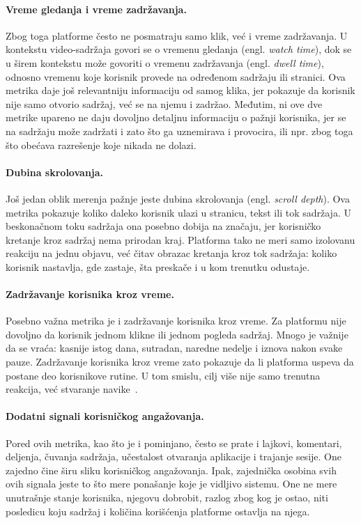 \paragraph{Vreme gledanja i vreme zadržavanja.}
Zbog toga platforme često ne posmatraju samo klik, već i vreme zadržavanja. U kontekstu video-sadržaja govori se o vremenu gledanja (engl. \textit{watch time}), dok se u širem kontekstu može govoriti o vremenu zadržavanja (engl. \textit{dwell time}), odnosno vremenu koje korisnik provede na određenom sadržaju ili stranici. Ova metrika daje još relevantniju informaciju od samog klika, jer pokazuje da korisnik nije samo otvorio sadržaj, već se na njemu i zadržao. Međutim, ni ove dve metrike upareno ne daju dovoljno detaljnu informaciju o pažnji korisnika, jer se na sadržaju može zadržati i zato što ga uznemirava i provocira, ili npr. zbog toga što obećava razrešenje koje nikada ne dolazi.

\paragraph{Dubina skrolovanja.}
Još jedan oblik merenja pažnje jeste dubina skrolovanja (engl. \textit{scroll depth}). Ova metrika pokazuje koliko daleko korisnik ulazi u stranicu, tekst ili tok sadržaja. U beskonačnom toku sadržaja ona posebno dobija na značaju, jer korisničko kretanje kroz sadržaj nema prirodan kraj. Platforma tako ne meri samo izolovanu reakciju na jednu objavu, već čitav obrazac kretanja kroz tok sadržaja: koliko korisnik nastavlja, gde zastaje, šta preskače i u kom trenutku odustaje.

\paragraph{Zadržavanje korisnika kroz vreme.}
Posebno važna metrika je i zadržavanje korisnika kroz vreme. Za platformu nije dovoljno da korisnik jednom klikne ili jednom pogleda sadržaj. Mnogo je važnije da se vraća: kasnije istog dana, sutradan, naredne nedelje i iznova nakon svake pauze. Zadržavanje korisnika kroz vreme zato pokazuje da li platforma uspeva da postane deo korisnikove rutine. U tom smislu, cilj više nije samo trenutna reakcija, već stvaranje navike~\cite{wu2017returning}.

\paragraph{Dodatni signali korisničkog angažovanja.}
Pored ovih metrika, kao što je i pominjano, često se prate i lajkovi, komentari, deljenja, čuvanja sadržaja, učestalost otvaranja aplikacije i trajanje sesije. One zajedno čine širu sliku korisničkog angažovanja. Ipak, zajednička osobina svih ovih signala jeste to što mere ponašanje koje je vidljivo sistemu. One ne mere unutrašnje stanje korisnika, njegovu dobrobit, razlog zbog kog je ostao, niti posledicu koju sadržaj i količina korišćenja platforme ostavlja na njega.


